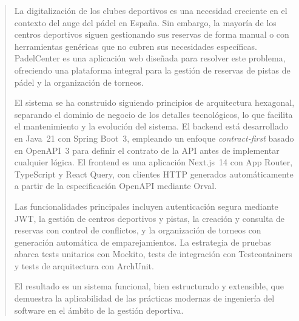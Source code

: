 
\pagestyle{empty}
\begin{abstract}
  La digitalización de los clubes deportivos es una necesidad creciente en el
  contexto del auge del pádel en España. Sin embargo, la mayoría de los centros
  deportivos siguen gestionando sus reservas de forma manual o con herramientas
  genéricas que no cubren sus necesidades específicas. PadelCenter es una
  aplicación web diseñada para resolver este problema, ofreciendo una plataforma
  integral para la gestión de reservas de pistas de pádel y la organización de
  torneos.

  El sistema se ha construido siguiendo principios de arquitectura hexagonal,
  separando el dominio de negocio de los detalles tecnológicos, lo que facilita
  el mantenimiento y la evolución del sistema. El backend está desarrollado en
  Java~21 con Spring Boot~3, empleando un enfoque \textit{contract-first} basado
  en OpenAPI~3 para definir el contrato de la API antes de implementar cualquier
  lógica. El frontend es una aplicación Next.js~14 con App Router, TypeScript y
  React Query, con clientes HTTP generados automáticamente a partir de la
  especificación OpenAPI mediante Orval.

  Las funcionalidades principales incluyen autenticación segura mediante JWT, la
  gestión de centros deportivos y pistas, la creación y consulta de reservas con
  control de conflictos, y la organización de torneos con generación automática
  de emparejamientos. La estrategia de pruebas abarca tests unitarios con
  Mockito, tests de integración con Testcontainers y tests de arquitectura con
  ArchUnit.

  El resultado es un sistema funcional, bien estructurado y extensible, que
  demuestra la aplicabilidad de las prácticas modernas de ingeniería del software
  en el ámbito de la gestión deportiva.
\end{abstract}

\clearpage
\pagestyle{empty}

\pagestyle{fancy}

